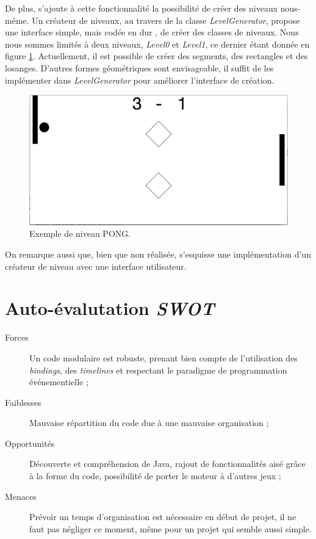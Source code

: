 \documentclass[a4paper,10pt]{article}
\theoremstyle{definition}
\begin{document}
	De plus, s'ajoute à cette fonctionnalité la possibilité de créer des niveaux nous-même. Un créateur de niveaux, au travers de la classe \emph{LevelGenerator}, propose une interface simple, mais \og codée en dur \fg{}, de créer des classes de niveaux. Nous nous sommes limités à deux niveaux, \emph{Level0} et \emph{Level1}, ce dernier étant donnée en figure \ref{fig:level1}. Actuellement, il est possible de créer des segments, des rectangles et des losanges. D'autres formes géométriques sont envisageable, il suffit de les implémenter dans \emph{LevelGenerator} pour améliorer l'interface de création. 
		
	\begin{figure}[!h]
  	  \begin{center}
    	    \includegraphics[width=\textwidth]{level1.png}
    	    \caption{Exemple de niveau PONG.}
    	    \label{fig:level1}
  	  \end{center}
	\end{figure}
	
	On remarque aussi que, bien que non réalisée, s'esquisse une implémentation d'un créateur de niveau avec une interface utilisateur.

\section*{Auto-évalutation \emph{SWOT}}

\begin{description}
	\item[Forces] Un code modulaire est robuste, prenant bien compte de l'utilisation des \emph{bindings}, des \emph{timelines} et respectant le paradigme de programmation événementielle ; 
	\item[Faiblesses] Mauvaise répartition du code due à une mauvaise organisation ;
	\item[Opportunités] Découverte et compréhension de Java, rajout de fonctionnalités aisé grâce à la forme du code, possibilité de porter le moteur à d'autres jeux ;
	\item[Menaces] Prévoir un temps d'organisation est nécessaire en début de projet, il ne faut pas négliger ce moment, même pour un projet qui semble aussi simple.
\end{description}
\end{document}
